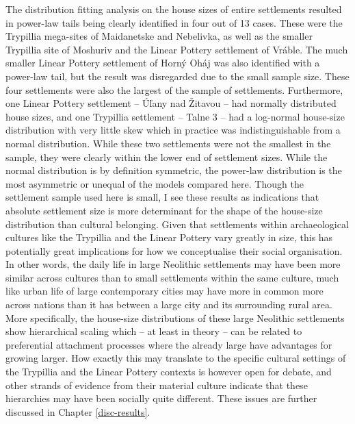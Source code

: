 \documentclass[
  12pt,
  a4paper, twoside]{book}
\begin{document}
The distribution fitting analysis on the house sizes of entire settlements resulted in power-law tails being clearly identified in four out of 13 cases. These were the Trypillia mega-sites of Maidanetske and Nebelivka, as well as the smaller Trypillia site of Moshuriv and the Linear Pottery settlement of Vráble. The much smaller Linear Pottery settlement of Horný Oháj was also identified with a power-law tail, but the result was disregarded due to the small sample size. These four settlements were also the largest of the sample of settlements. Furthermore, one Linear Pottery settlement -- Úľany nad Žitavou -- had normally distributed house sizes, and one Trypillia settlement -- Talne 3 -- had a log-normal house-size distribution with very little skew which in practice was indistinguishable from a normal distribution. While these two settlements were not the smallest in the sample, they were clearly within the lower end of settlement sizes. While the normal distribution is by definition symmetric, the power-law distribution is the most asymmetric or unequal of the models compared here. Though the settlement sample used here is small, I see these results as indications that absolute settlement size is more determinant for the shape of the house-size distribution than cultural belonging. Given that settlements within archaeological cultures like the Trypillia and the Linear Pottery vary greatly in size, this has potentially great implications for how we conceptualise their social organisation. In other words, the daily life in large Neolithic settlements may have been more similar across cultures than to small settlements within the same culture, much like urban life of large contemporary cities may have more in common more across nations than it has between a large city and its surrounding rural area. More specifically, the house-size distributions of these large Neolithic settlements show hierarchical scaling which -- at least in theory -- can be related to preferential attachment processes where the already large have advantages for growing larger. How exactly this may translate to the specific cultural settings of the Trypillia and the Linear Pottery contexts is however open for debate, and other strands of evidence from their material culture indicate that these hierarchies may have been socially quite different. These issues are further discussed in Chapter \ref{disc-results}.
\end{document}
